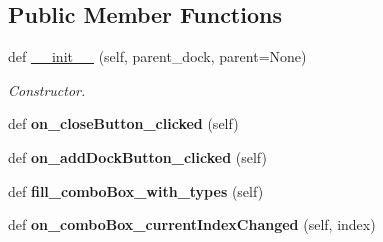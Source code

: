 \subsection*{Public Member Functions}
\begin{DoxyCompactItemize}
\item 
def \hyperlink{classplume-creator_1_1src_1_1plume_1_1gui_1_1docks_1_1_dock_title_widget_ad0daef17a8e559e51b5f25d7a4b91e10}{\+\_\+\+\_\+init\+\_\+\+\_\+} (self, parent\+\_\+dock, parent=None)\hypertarget{classplume-creator_1_1src_1_1plume_1_1gui_1_1docks_1_1_dock_title_widget_ad0daef17a8e559e51b5f25d7a4b91e10}{}\label{classplume-creator_1_1src_1_1plume_1_1gui_1_1docks_1_1_dock_title_widget_ad0daef17a8e559e51b5f25d7a4b91e10}

\begin{DoxyCompactList}\small\item\em Constructor. \end{DoxyCompactList}\item 
def {\bfseries on\+\_\+close\+Button\+\_\+clicked} (self)\hypertarget{classplume-creator_1_1src_1_1plume_1_1gui_1_1docks_1_1_dock_title_widget_a2ce31bd2cf9f5fef79fa4ce648f37724}{}\label{classplume-creator_1_1src_1_1plume_1_1gui_1_1docks_1_1_dock_title_widget_a2ce31bd2cf9f5fef79fa4ce648f37724}

\item 
def {\bfseries on\+\_\+add\+Dock\+Button\+\_\+clicked} (self)\hypertarget{classplume-creator_1_1src_1_1plume_1_1gui_1_1docks_1_1_dock_title_widget_a37d66f67e1306a3623dadaeac8ad71cb}{}\label{classplume-creator_1_1src_1_1plume_1_1gui_1_1docks_1_1_dock_title_widget_a37d66f67e1306a3623dadaeac8ad71cb}

\item 
def {\bfseries fill\+\_\+combo\+Box\+\_\+with\+\_\+types} (self)\hypertarget{classplume-creator_1_1src_1_1plume_1_1gui_1_1docks_1_1_dock_title_widget_a829d897f4ea8c7921d3cbf2606ab4a96}{}\label{classplume-creator_1_1src_1_1plume_1_1gui_1_1docks_1_1_dock_title_widget_a829d897f4ea8c7921d3cbf2606ab4a96}

\item 
def {\bfseries on\+\_\+combo\+Box\+\_\+current\+Index\+Changed} (self, index)\hypertarget{classplume-creator_1_1src_1_1plume_1_1gui_1_1docks_1_1_dock_title_widget_a0e8f7aee86892897badb5707e07f16f5}{}\label{classplume-creator_1_1src_1_1plume_1_1gui_1_1docks_1_1_dock_title_widget_a0e8f7aee86892897badb5707e07f16f5}

\end{DoxyCompactItemize}
